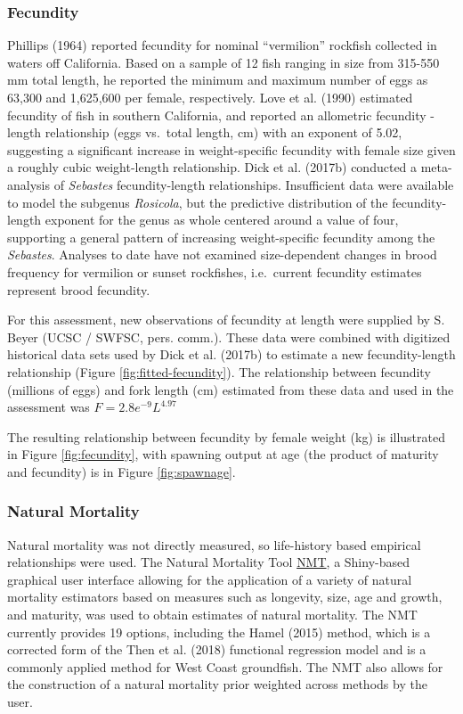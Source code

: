 \documentclass[
  english,
  a4paper,
]{article}
\begin{document}
\hypertarget{fecundity}{%
\subsubsection{Fecundity}\label{fecundity}}

Phillips (1964) reported fecundity for nominal ``vermilion'' rockfish collected in waters off California. Based on a sample of 12 fish ranging in size from 315-550 mm total length, he reported the minimum and maximum number of eggs as 63,300 and 1,625,600 per female, respectively. Love et al. (1990) estimated fecundity of fish in southern California, and reported an allometric fecundity - length relationship (eggs vs.~total length, cm) with an exponent of 5.02, suggesting a significant increase in weight-specific fecundity with female size given a roughly cubic weight-length relationship. Dick et al. (2017b) conducted a meta-analysis of \emph{Sebastes} fecundity-length relationships. Insufficient data were available to model the subgenus \emph{Rosicola}, but the predictive distribution of the fecundity-length exponent for the genus as whole centered around a value of four, supporting a general pattern of increasing weight-specific fecundity among the \emph{Sebastes}. Analyses to date have not examined size-dependent changes in brood frequency for vermilion or sunset rockfishes, i.e.~current fecundity estimates represent brood fecundity.

For this assessment, new observations of fecundity at length were supplied by S. Beyer (UCSC / SWFSC, pers. comm.). These data were combined with digitized historical data sets used by Dick et al. (2017b) to estimate a new fecundity-length relationship (Figure \ref{fig:fitted-fecundity}). The relationship between fecundity (millions of eggs) and fork length (cm) estimated from these data and used in the assessment was
\(F = 2.8e^{-9}L^{4.97}\)

The resulting relationship between fecundity by female weight (kg) is illustrated in Figure \ref{fig:fecundity}, with spawning output at age (the product of maturity and fecundity) is in Figure \ref{fig:spawnage}.

\hypertarget{natural-mortality}{%
\subsubsection{Natural Mortality}\label{natural-mortality}}

Natural mortality was not directly measured, so life-history based empirical
relationships were used. The Natural Mortality Tool
\href{https://github.com/shcaba/Natural-Mortality-Tool}{NMT}, a Shiny-based
graphical user interface allowing for the application of a variety of natural
mortality estimators based on measures such as longevity, size, age and growth,
and maturity, was used to obtain estimates of natural mortality. The NMT currently
provides 19 options, including the Hamel (2015) method, which is a corrected
form of the Then et al. (2018) functional regression model and is a commonly
applied method for West Coast groundfish. The NMT also allows for the construction
of a natural mortality prior weighted across methods by the user.
\end{document}
